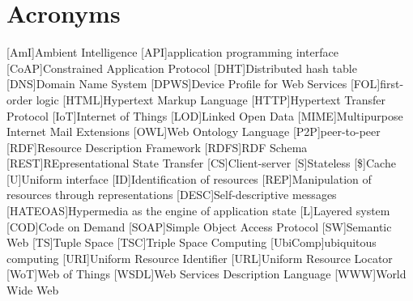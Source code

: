 


\chapter*{Acronyms}

\begin{acronym}
  [AmI]{Ambient Intelligence}
  [API]{application programming interface}
  [CoAP]{Constrained Application Protocol}
  [DHT]{Distributed hash table}
  [DNS]{Domain Name System}
  [DPWS]{Device Profile for Web Services}
  [FOL]{first-order logic}
  [HTML]{Hypertext Markup Language}
  [HTTP]{Hypertext Transfer Protocol}
  [IoT]{Internet of Things}
  [LOD]{Linked Open Data}
  [MIME]{Multipurpose Internet Mail Extensions}
  [OWL]{Web Ontology Language}
  [P2P]{peer-to-peer}
  [RDF]{Resource Description Framework}
  [RDFS]{RDF Schema}
  [REST]{REpresentational State Transfer} %
    [CS]{Client-server}
    [S]{Stateless}
    [\$]{Cache}
    [U]{Uniform interface}
    [ID]{Identification of resources}
    [REP]{Manipulation of resources through representations}
    [DESC]{Self-descriptive messages}
    [HATEOAS]{Hypermedia as the engine of application state}
    [L]{Layered system}
    [COD]{Code on Demand} %
  [SOAP]{Simple Object Access Protocol}
  [SW]{Semantic Web}
  [TS]{Tuple Space}
  [TSC]{Triple Space Computing}
  [UbiComp]{ubiquitous computing}
  [URI]{Uniform Resource Identifier}
  [URL]{Uniform Resource Locator}
  [WoT]{Web of Things}
  [WSDL]{Web Services Description Language}
  [WWW]{World Wide Web} %
\end{acronym}

